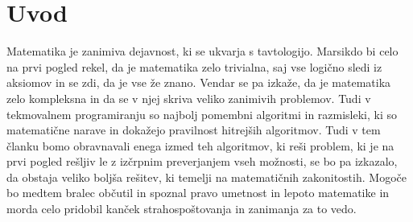 \section{Uvod}\label{sec:uvod}
Matematika je zanimiva dejavnost, ki se ukvarja s tavtologijo.
Marsikdo bi celo na prvi pogled rekel, da je matematika zelo trivialna, saj vse logično sledi iz aksiomov in se zdi, da je vse že znano.
Vendar se pa izkaže, da je matematika zelo kompleksna in da se v njej skriva veliko zanimivih problemov.
Tudi v tekmovalnem programiranju so najbolj pomembni algoritmi in razmisleki, ki so matematične narave in dokažejo pravilnost hitrejših algoritmov.
Tudi v tem članku bomo obravnavali enega izmed teh algoritmov, ki reši problem, ki je na prvi pogled rešljiv le z izčrpnim preverjanjem vseh možnosti, se bo
pa izkazalo, da obstaja veliko boljša rešitev, ki temelji na matematičnih zakonitostih.
Mogoče bo medtem bralec občutil in spoznal pravo umetnost in lepoto matematike in morda celo pridobil kanček strahospoštovanja in zanimanja za to vedo.